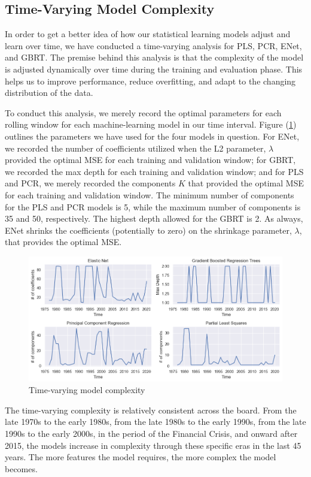 \subsection{Time-Varying Model Complexity}

In order to get a better idea of how our statistical learning models adjust and learn over time, we have conducted a time-varying analysis for PLS, PCR, ENet, and GBRT. The premise behind this analysis is that the complexity of the model is adjusted dynamically over time during the training and evaluation phase. This helps us to improve performance, reduce overfitting, and adapt to the changing distribution of the data.

To conduct this analysis, we merely record the optimal parameters for each rolling window for each machine-learning model in our time interval. Figure (\ref{fig:complexity}) outlines the parameters we have used for the four models in question. For ENet, we recorded the number of coefficients utilized when the L2 parameter, $\lambda$ provided the optimal MSE for each training and validation window; for GBRT, we recorded the max depth for each training and validation window; and for PLS and PCR, we merely recorded the components $K$ that provided the optimal MSE for each training and validation window. The minimum number of components for the PLS and PCR models is 5, while the maximum number of components is 35 and 50, respectively. The highest depth allowed for the GBRT is 2. As always, ENet shrinks the coefficients (potentially to zero) on the shrinkage parameter, $\lambda$, that provides the optimal MSE.

\begin{figure}[h]\label{fig:complexity}
	\centering
	\includegraphics[width=17cm]{content/images/complexity}
	\caption{Time-varying model complexity}
\end{figure}

The time-varying complexity is relatively consistent across the board. From the late 1970s to the early 1980s, from the late 1980s to the early 1990s, from the late 1990s to the early 2000s, in the period of the Financial Crisis, and onward after 2015, the models increase in complexity through these specific eras in the last 45 years. The more features the model requires, the more complex the model becomes.

